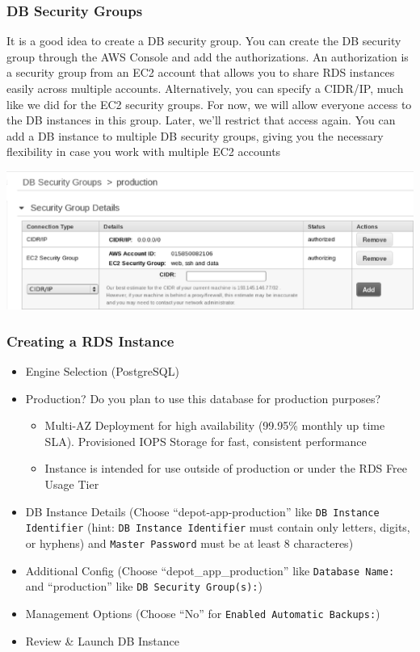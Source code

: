 \documentclass{beamer}
\begin{document}
\begin{frame}
\frametitle{DB Security Groups}
It is a good idea to create a DB security group. You can create the DB security group through the AWS Console and add the authorizations.
An authorization is a security group from an EC2 account that allows you to
share RDS instances easily across multiple accounts. Alternatively, you can specify a
CIDR/IP, much like we did for the EC2 security groups. For now, we will allow everyone
access to the DB instances in this group. Later, we’ll restrict that access again. You can
add a DB instance to multiple DB security groups, giving you the necessary flexibility
in case you work with multiple EC2 accounts

\begin{center}
      \includegraphics[scale=0.25]{securitydb.eps}
\end{center}
\end{frame}
\begin{frame}
\frametitle{Creating a RDS Instance}
\begin{itemize}
 \item Engine Selection (PostgreSQL)
 \item Production? Do you plan to use this database for production purposes?
    \begin{itemize}
      \item Multi-AZ Deployment for high availability (99.95\% monthly up time SLA). Provisioned IOPS Storage for fast, consistent performance
      \item Instance is intended for use outside of production or under the \alert{RDS Free Usage Tier}
    \end{itemize}
 \item DB Instance Details (Choose ``depot-app-production'' like \texttt{DB Instance Identifier} (hint: \texttt{DB Instance Identifier} must contain only letters, digits, or hyphens) and \texttt{Master Password} must be at least 8 characteres)
  \item Additional Config (Choose ``depot\_app\_production'' like \texttt{Database Name:} and ``production'' like \texttt{DB Security Group(s):})
  \item Management Options (Choose ``No'' for \texttt{Enabled Automatic Backups:}) 
  \item Review \& Launch DB Instance
  \end{itemize}
\end{frame}
\end{document}

